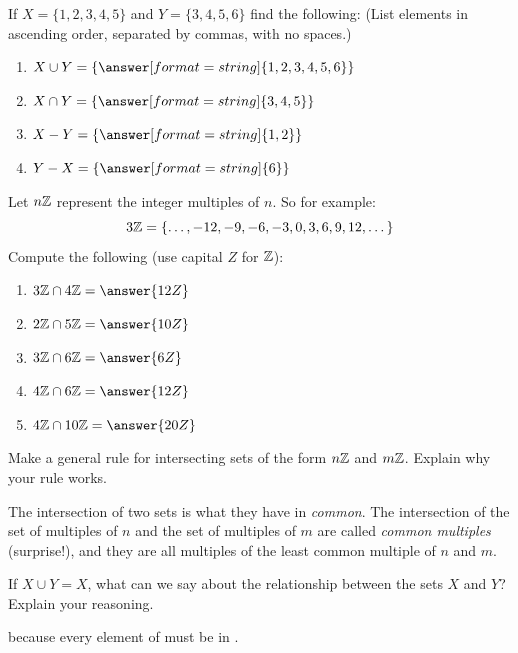 \documentclass[nooutcomes]{ximera}
\begin{document}
\begin{problem}
If $X = \{1,2,3,4,5\}$ and $Y = \{3,4,5,6\}$ find the following: (List elements in ascending order, separated by commas, with no spaces.)
\begin{enumerate}
\item $X\cup Y = \{\answer[format=string]{1,2,3,4,5,6}\}$
\item $X\cap Y = \{\answer[format=string]{3,4,5}\}$
\item $X-Y = \{\answer[format=string]{1,2}\}$
\item $Y-X = \{\answer[format=string]{6}\}$
\end{enumerate}
\end{problem}

\begin{problem}
Let $n\mathbb Z$ represent the integer multiples of $n$. So for example:
\[
3\mathbb Z = \{\dots,-12,-9,-6,-3,0,3,6,9,12,\dots\}
\]
Compute the following (use capital $Z$ for $\mathbb Z$):
\begin{enumerate}
\item $3\Z\cap 4\Z = \answer{12Z}$ 
\item $2\Z\cap 5\Z = \answer{10Z}$
\item $3\Z\cap 6\Z = \answer{6Z}$
\item $4\Z\cap 6\Z = \answer{12Z}$
\item $4\Z\cap 10\Z = \answer{20Z}$
\end{enumerate}
\end{problem}

\begin{problem}
Make a general rule for intersecting sets of the form $n\mathbb Z$ and
  $m\mathbb Z$. Explain why your rule works.
\begin{freeResponse}
\begin{hint}
The intersection of two sets is what they have in \emph{common}.  The intersection of the set of multiples of $n$ and the set of multiples of $m$ are called \emph{common multiples} (surprise!), and they are all multiples of the least common multiple of $n$ and $m$.  
\end{hint}
\end{freeResponse}
\end{problem}

\begin{problem}
If $X\cup Y = X$, what can we say about the relationship between the sets $X$ and $Y$? Explain your reasoning.

because every element of  must be in .

\end{problem}
\end{document}
